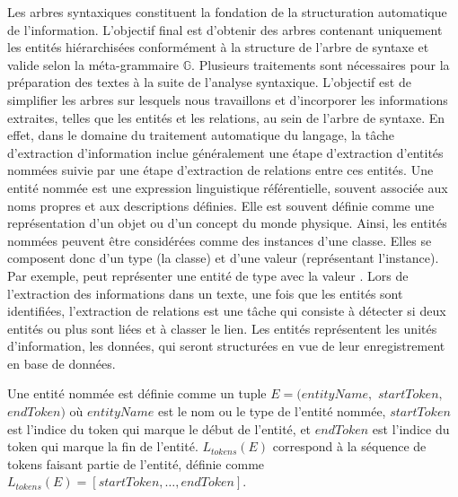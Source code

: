 Les arbres syntaxiques constituent la fondation de la structuration automatique de l'information.
L'objectif final est d'obtenir des arbres contenant uniquement les entités hiérarchisées conformément à la structure de l'arbre de syntaxe et valide selon la méta-grammaire $\mathbb{G}$.
Plusieurs traitements sont nécessaires pour la préparation des textes à la suite de l'analyse syntaxique.
L'objectif est de simplifier les arbres sur lesquels nous travaillons et d'incorporer les informations extraites, telles que les entités et les relations, au sein de l'arbre de syntaxe.
En effet, dans le domaine du traitement automatique du langage, la tâche d'extraction d'information inclue généralement une étape d'extraction d'entités nommées suivie par une étape d'extraction de relations entre ces entités.
Une entité nommée est une expression linguistique référentielle, souvent associée aux noms propres et aux descriptions définies.
Elle est souvent définie comme une représentation d'un objet ou d'un concept du monde physique.
Ainsi, les entités nommées peuvent être considérées comme des instances d'une classe.
Elles se composent donc d'un type (la classe) et d'une valeur (représentant l'instance).
Par exemple,  peut représenter une entité de type  avec la valeur .
Lors de l'extraction des informations dans un texte, une fois que les entités sont identifiées, l'extraction de relations est une tâche qui consiste à détecter si deux entités ou plus sont liées et à classer le lien.
Les entités représentent les unités d'information, les données, qui seront structurées en vue de leur enregistrement en base de données.


\begin{definition}
    Une entité nommée est définie comme un tuple $E = (entityName,$ $startToken,$ $endToken)$ où $entityName$ est le nom ou le type de l'entité nommée, $startToken$ est l'indice du token qui marque le début de l'entité, et $endToken$ est l'indice du token qui marque la fin de l'entité.
    $L_{tokens}(E)$ correspond à la séquence de tokens faisant partie de l'entité, définie comme $L_{tokens}(E) = [startToken, \dots, endToken]$.
\end{definition}

